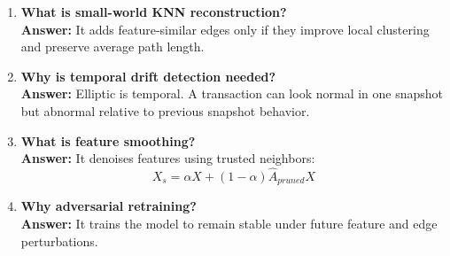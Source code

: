 \documentclass[12pt,a4paper]{article}
\begin{document}
\begin{enumerate}[label=\textbf{Q\arabic*.},resume]
    \item \textbf{What is small-world KNN reconstruction?}\\
    \textbf{Answer:} It adds feature-similar edges only if they improve local clustering and preserve average path length.

    \item \textbf{Why is temporal drift detection needed?}\\
    \textbf{Answer:} Elliptic is temporal. A transaction can look normal in one snapshot but abnormal relative to previous snapshot behavior.

    \item \textbf{What is feature smoothing?}\\
    \textbf{Answer:} It denoises features using trusted neighbors:
    $$
    X_s=\alpha X+(1-\alpha)\hat{A}_{pruned}X
    $$

    \item \textbf{Why adversarial retraining?}\\
    \textbf{Answer:} It trains the model to remain stable under future feature and edge perturbations.
\end{enumerate}
\end{document}
